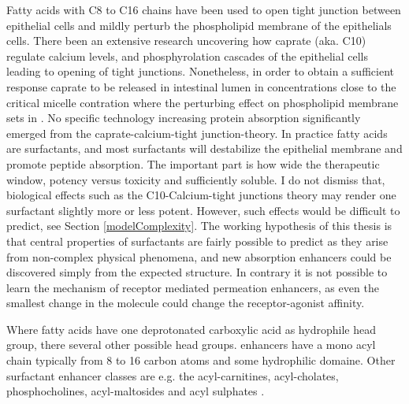 Fatty acids with C8 to C16 chains have been used to open tight junction between epithelial cells and mildly perturb the phospholipid membrane of the epithelials cells. There \DIFdelbegin {}\DIFdelend \DIFaddbegin {}\DIFaddend been an extensive research \cite{bruno2013basics,maher2009safety,artursson1990epithelial} uncovering how caprate (aka. C10) regulate calcium levels, and phosphyrolation cascades of the epithelial cells leading to opening of tight junctions. Nonetheless, in order to obtain a sufficient response caprate \DIFdelbegin {}\DIFdelend \DIFaddbegin {}\DIFaddend to be released in intestinal lumen in concentrations close to the critical micelle contration \DIFdelbegin {}\DIFdelend \DIFaddbegin {}\DIFaddend where the perturbing effect on \DIFaddbegin {}\DIFaddend phospholipid membrane sets in \cite{bruno2013basics}. No specific technology increasing protein absorption significantly \DIFdelbegin {}\DIFdelend \DIFaddbegin {}\DIFaddend emerged from the caprate-calcium-tight junction-theory. In practice fatty acids are surfactants, and most surfactants will destabilize the epithelial membrane and promote peptide absorption. The important part is how wide \DIFdelbegin {}\DIFdelend \DIFaddbegin {}\DIFaddend the therapeutic window, potency versus toxicity and \DIFdelbegin {}\DIFdelend \DIFaddbegin {}\DIFaddend sufficiently soluble. I do not dismiss that, biological effects such as the C10-Calcium-tight junctions \DIFaddbegin {}\DIFaddend theory may render one surfactant slightly more or less potent. However, such effects would be difficult to predict, see Section \ref{modelComplexity}. The working hypothesis of this thesis is that central properties of surfactants are fairly possible to predict as they arise from non-complex physical phenomena, and new absorption enhancers could be discovered simply from the expected structure. In contrary it is not possible to learn the mechanism of receptor mediated permeation enhancers, as even the smallest change in the molecule could change the receptor-agonist affinity.

Where fatty acids have one deprotonated carboxylic acid as hydrophile head group, there several other possible head groups. \DIFdelbegin {}\DIFdelend \DIFaddbegin {}\DIFaddend enhancers have a mono acyl chain typically from 8 to 16 carbon atoms and some hydrophilic domaine. Other surfactant enhancer classes are e.g. the acyl-carnitines, acyl-cholates\cite{lee2000oral}, phosphocholines\cite{liu1999dodecylphosphocholine}, acyl-maltosides \cite{petersen2013colonic} and acyl sulphates \cite{anderberg1993epithelial}.

